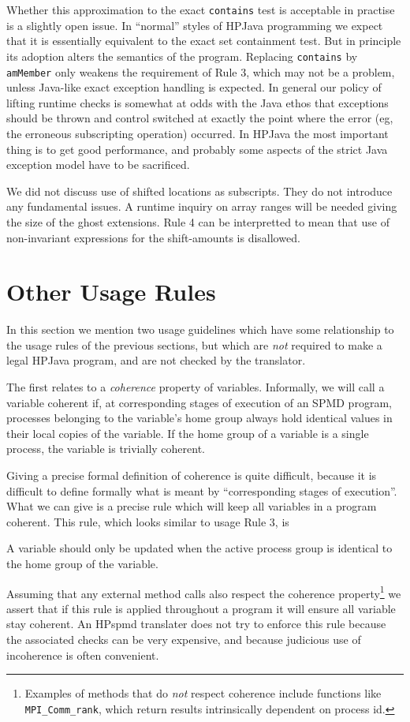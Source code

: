 \documentclass{article}
\begin{document}
Whether this approximation to the exact {\tt contains} test is
acceptable in practise is a slightly open issue.  In ``normal'' styles
of HPJava programming we expect that it is essentially equivalent to
the exact set containment test.  But in principle its adoption
alters the semantics of the program.  Replacing {\tt contains} by {\tt
amMember} only weakens the requirement of Rule 3, which may not be
a problem, unless Java-like exact exception handling is expected.
In general our policy of lifting runtime checks is somewhat at odds
with the Java ethos that exceptions should be thrown and control
switched at exactly the point where the error (eg, the erroneous
subscripting operation) occurred.  In HPJava the most important thing
is to get good performance, and probably some aspects of the strict
Java exception model have to be sacrificed.

We did not discuss use of shifted locations as subscripts.  They do not
introduce any fundamental issues.  A runtime inquiry on array ranges
will be needed giving the size of the ghost extensions.  Rule 4 can be
interpretted to mean that use of non-invariant expressions for the
shift-amounts is disallowed.

\section{Other Usage Rules}

In this section we mention two usage guidelines which have some
relationship to the usage rules of the previous sections, but which
are {\em not} required to make a legal HPJava program, and are not
checked by the translator.

The first relates to a {\em coherence} property of variables.
Informally, we will call a variable coherent if, at corresponding stages
of execution of an SPMD program, processes belonging to the
variable's home group always hold identical values in their local copies
of the variable.  If the home group of a variable is a single process,
the variable is trivially coherent.

Giving a precise formal definition of coherence is quite difficult,
because it is difficult to define formally what is meant by
``corresponding stages of execution''.  What we can give is
a precise rule which will keep all variables in a program coherent.
This rule, which looks similar to usage Rule 3, is
\begin{usageRule}
A variable should only be updated when the active process
group is identical to the home group of the variable.
\end{usageRule}
Assuming that any external method calls also respect the coherence
property\footnote{Examples of methods that do {\em not} respect
coherence include functions like {\tt MPI\_Comm\_rank}, which return
results intrinsically dependent on process id.} we assert that
if this rule is applied throughout a program it will ensure all
variable stay coherent.  An HPspmd translater does not try to enforce
this rule because the associated checks can be very expensive, and
because judicious use of incoherence is often convenient.
\end{document}
